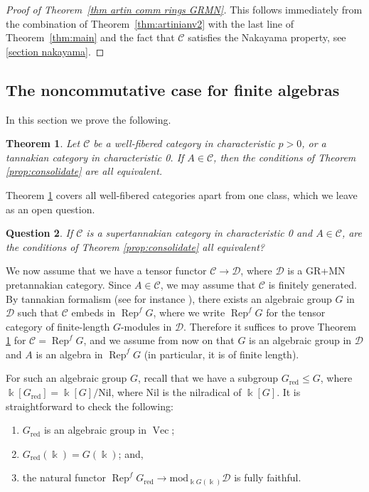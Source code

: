 \documentclass[11pt]{amsart}
\def\Cs{\mathscr{C}}
\def\Ds{\mathscr{D}}
\def\cC{\mathscr{C}}
\def\mod{\mathrm{ mod}}
\def\Rep{\operatorname{Rep}}
\def\Vec{\operatorname{Vec}}
\newtheorem{thm}{Theorem}[section]
\newtheorem{question}[thm]{Question}
\theoremstyle{definition}
\theoremstyle{remark}
\numberwithin{equation}{section}
\begin{document}
\begin{proof}[Proof of Theorem~\ref{thm artin comm rings GRMN}]
This follows immediately from the combination of Theorem~\ref{thm:artinianv2} with the last line of Theorem~\ref{thm:main} and the fact that $\cC$ satisfies the Nakayama property, see \ref{section nakayama}.
\end{proof}


\subsection{The noncommutative case for finite algebras}



In this section we prove the following.

\begin{thm}\label{thm noncomm case}
    Let $\Cs$ be a well-fibered category in characteristic $p>0$, or a tannakian category in characteristic 0.  If $A\in\Cs$, then the conditions of Theorem \ref{prop:consolidate} are all equivalent.
\end{thm}

Theorem \ref{thm noncomm case} covers all well-fibered categories apart from one class, which we leave as an open question.

\begin{question}\label{question:super}
    If $\Cs$ is a supertannakian category in characteristic 0 and $A\in\Cs$, are the conditions of Theorem \ref{prop:consolidate} all equivalent?
\end{question}


We now assume that we have a tensor functor $\Cs\to\Ds$, where $\Ds$ is a GR+MN pretannakian category.  Since $A\in\Cs$, we may assume that $\Cs$ is finitely generated.  By tannakian formalism (see for instance \cite[\S 4]{CEO}), there exists an algebraic group $G$ in $\Ds$ such that $\Cs$ embeds in $\Rep^f G$, where we write $\Rep^f G$ for the tensor category of finite-length $G$-modules in $\Ds$.  Therefore it suffices to prove Theorem \ref{thm noncomm case} for $\Cs=\Rep^f G$, and we assume from now on that $G$ is an algebraic group in $\Ds$ and $A$ is an algebra in $\Rep^f G$ (in particular, it is of finite length).

For such an algebraic group $G$, recall that we have a subgroup $G_{\mathrm{red}}\leq G$, where $\Bbbk[G_{\mathrm{red}}]=\Bbbk[G]/\text{Nil}$, where $\text{Nil}$ is the nilradical of $\Bbbk[G]$.  It is straightforward to check the following:
\begin{enumerate}
    \item $G_{\mathrm{red}}$ is an algebraic group in $\Vec$;
    \item $G_{\mathrm{red}}(\Bbbk)=G(\Bbbk)$; and,
    \item the natural functor $\Rep^f G_{\mathrm{red}}\to\mod_{\Bbbk G(\Bbbk)}\Ds$ is fully faithful.
\end{enumerate}
\end{document}
